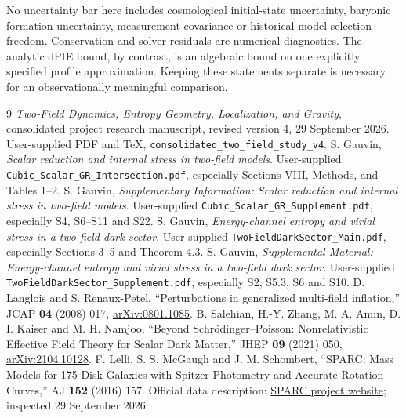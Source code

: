 \documentclass[11pt]{article}
\begin{document}
No uncertainty bar here includes cosmological initial-state uncertainty, baryonic formation uncertainty, measurement covariance or historical model-selection freedom. Conservation and solver residuals are numerical diagnostics. The analytic dPIE bound, by contrast, is an algebraic bound on one explicitly specified profile approximation. Keeping these statements separate is necessary for an observationally meaningful comparison.

\begingroup\small\raggedright
\setlength{\parskip}{0pt}
\begin{thebibliography}{9}
\setlength{\itemsep}{1pt}
 \emph{Two-Field Dynamics, Entropy Geometry, Localization, and Gravity}, consolidated project research manuscript, revised version 4, 29 September 2026. User-supplied PDF and TeX, \texttt{consolidated\_two\_field\_study\_v4}.
 S. Gauvin, \emph{Scalar reduction and internal stress in two-field models}. User-supplied \texttt{Cubic\_Scalar\_GR\_Intersection.pdf}, especially Sections VIII, Methods, and Tables 1--2.
 S. Gauvin, \emph{Supplementary Information: Scalar reduction and internal stress in two-field models}. User-supplied \texttt{Cubic\_Scalar\_GR\_Supplement.pdf}, especially S4, S6--S11 and S22.
 S. Gauvin, \emph{Energy-channel entropy and virial stress in a two-field dark sector}. User-supplied \texttt{TwoFieldDarkSector\_Main.pdf}, especially Sections 3--5 and Theorem 4.3.
 S. Gauvin, \emph{Supplemental Material: Energy-channel entropy and virial stress in a two-field dark sector}. User-supplied \texttt{TwoFieldDarkSector\_Supplement.pdf}, especially S2, S5.3, S6 and S10.
 D. Langlois and S. Renaux-Petel, ``Perturbations in generalized multi-field inflation,'' JCAP \textbf{04} (2008) 017, \href{https://arxiv.org/abs/0801.1085}{arXiv:0801.1085}.
 B. Salehian, H.-Y. Zhang, M. A. Amin, D. I. Kaiser and M. H. Namjoo, ``Beyond Schr\"odinger--Poisson: Nonrelativistic Effective Field Theory for Scalar Dark Matter,'' JHEP \textbf{09} (2021) 050, \href{https://arxiv.org/abs/2104.10128}{arXiv:2104.10128}.
 F. Lelli, S. S. McGaugh and J. M. Schombert, ``SPARC: Mass Models for 175 Disk Galaxies with Spitzer Photometry and Accurate Rotation Curves,'' AJ \textbf{152} (2016) 157. Official data description: \href{https://astroweb.cwru.edu/SPARC/}{SPARC project website}; inspected 29 September 2026.
\end{thebibliography}
\endgroup
\end{document}

